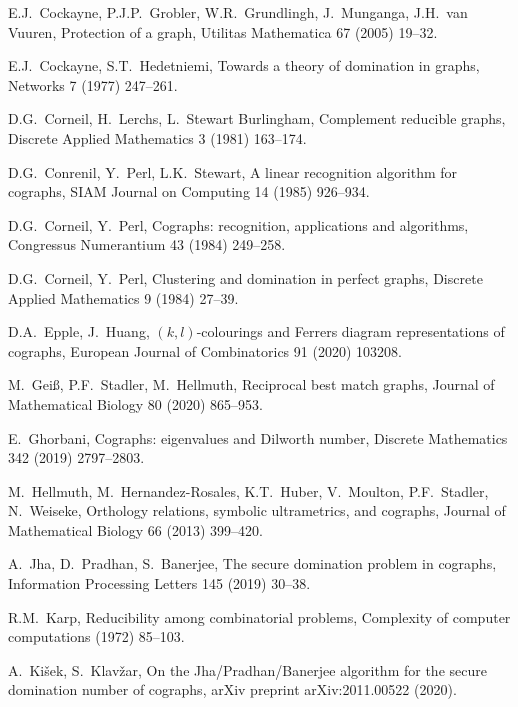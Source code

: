 \documentclass[12pt,a4paper,twoside]{article}
\theoremstyle{definition} %
\theoremstyle{plain} %
\numberwithin{equation}{section}  %
\begin{document}
\begin{thebibliography}{99}
    E.J.~Cockayne, P.J.P.~Grobler, W.R.~Grundlingh, J.~Munganga, J.H.~van Vuuren,
    Protection of a graph,
    Utilitas Mathematica 67 (2005) 19--32.
    
    E.J.~Cockayne, S.T.~Hedetniemi,
    Towards a theory of domination in graphs,
    Networks 7 (1977) 247--261.
    
    D.G.~Corneil, H.~Lerchs, L.~Stewart Burlingham,
    Complement reducible graphs,
    Discrete Applied Mathematics 3 (1981) 163--174.
    
    D.G.~Conrenil, Y.~Perl, L.K.~Stewart,
    A linear recognition algorithm for cographs,
    SIAM Journal on Computing 14 (1985) 926--934.
   
    D.G.~Corneil, Y.~Perl,
    Cographs: recognition, applications and algorithms,
    Congressus Numerantium 43 (1984) 249--258.
    
    D.G.~Corneil, Y.~Perl,
    Clustering and domination in perfect graphs,
    Discrete Applied Mathematics 9 (1984) 27--39.
    
    D.A.~Epple, J.~Huang,
    $(k, l)$-colourings and Ferrers diagram representations of cographs,
    European Journal of Combinatorics 91 (2020) 103208.
    
    M.~Gei{\ss}, P.F.~Stadler, M.~Hellmuth,
    Reciprocal best match graphs,
    Journal of Mathematical Biology 80 (2020) 865--953.
    
    E.~Ghorbani,
    Cographs: eigenvalues and Dilworth number,
    Discrete Mathematics 342 (2019) 2797--2803.

    M.~Hellmuth, M.~Hernandez-Rosales, K.T.~Huber, V.~Moulton, P.F.~Stadler, N.~Weiseke,
    Orthology relations, symbolic ultrametrics, and cographs,
    Journal of Mathematical Biology 66 (2013) 399--420.

  A.~Jha, D.~Pradhan, S.~Banerjee, 
  The secure domination problem in cographs,
  Information Processing Letters 145 (2019) 30--38.
  
    R.M.~Karp,
    Reducibility among combinatorial problems,
    Complexity of computer computations (1972) 85--103.
    
    A.~Kišek, S.~Klavžar,
    On the Jha/Pradhan/Banerjee algorithm for the secure domination number of cographs,
    arXiv preprint arXiv:2011.00522 (2020).
    

\end{thebibliography}
\end{document}
